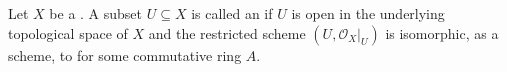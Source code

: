 \begin{definition} \label{definition:affine_open_subscheme_of_a_scheme}
Let $X$ be a . A subset $U \subseteq X$ is called an  if $U$ is open in the underlying topological space of $X$ and the restricted scheme $(U, \mathcal{O}_X|_U)$ is isomorphic, as a scheme, to  for some commutative ring $A$.
\end{definition}
